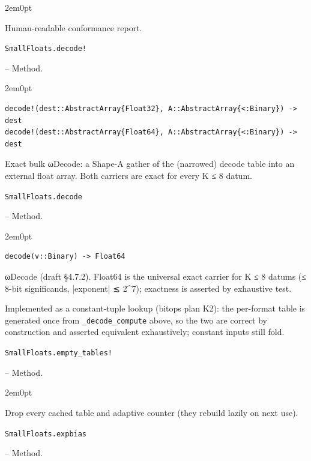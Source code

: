 \begin{adjustwidth}{2em}{0pt}

Human-readable conformance report.



\end{adjustwidth}
\hypertarget{17071822498540248224}{\texttt{SmallFloats.decode!}}  -- {Method.}

\begin{adjustwidth}{2em}{0pt}


\begin{verbatim}
decode!(dest::AbstractArray{Float32}, A::AbstractArray{<:Binary}) -> dest
decode!(dest::AbstractArray{Float64}, A::AbstractArray{<:Binary}) -> dest
\end{verbatim}

Exact bulk ωDecode: a Shape-A gather of the (narrowed) decode table into an external float array. Both carriers are exact for every K ≤ 8 datum.



\end{adjustwidth}
\hypertarget{15004588707537249672}{\texttt{SmallFloats.decode}}  -- {Method.}

\begin{adjustwidth}{2em}{0pt}


\begin{verbatim}
decode(v::Binary) -> Float64
\end{verbatim}

ωDecode (draft §4.7.2). Float64 is the universal exact carrier for K ≤ 8 datums (≤ 8-bit significands, |exponent| ≲ 2{\textasciicircum}7); exactness is asserted by exhaustive test.

Implemented as a constant-tuple lookup (bitops plan K2): the per-format table is generated once from \texttt{\_decode\_compute} above, so the two are correct by construction and asserted equivalent exhaustively; constant inputs still fold.



\end{adjustwidth}
\hypertarget{14130930211625684600}{\texttt{SmallFloats.empty\_tables!}}  -- {Method.}

\begin{adjustwidth}{2em}{0pt}

Drop every cached table and adaptive counter (they rebuild lazily on next use).



\end{adjustwidth}
\hypertarget{9308606959501922909}{\texttt{SmallFloats.expbias}}  -- {Method.}

